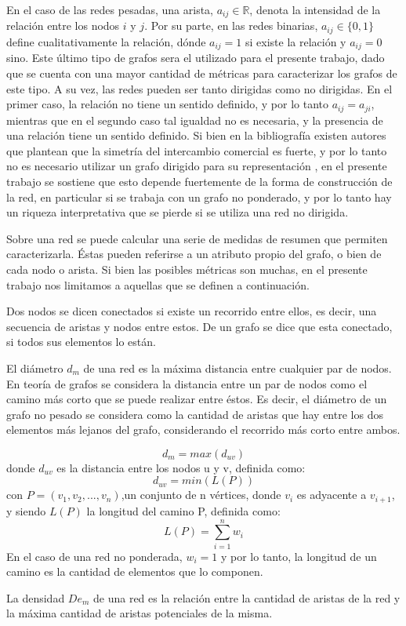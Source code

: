 \documentclass[a4paper]{article}
\begin{document}
En el caso de las redes pesadas, una arista, $a_{ij} \in \mathbb{R}$, denota la intensidad de la relación entre los nodos $i$ y $j$. Por su parte, en las redes binarias, $a_{ij} \in \{0,1\}$ define cualitativamente la relación, dónde $a_{ij} = 1$ si existe la relación y $a_{ij} = 0$ sino. Este último tipo de grafos sera el utilizado para el presente trabajo, dado que se cuenta con una mayor cantidad de métricas para caracterizar los grafos de este tipo.      
A su vez, las redes pueden ser tanto dirigidas como no dirigidas. En el primer caso, la relación no tiene un sentido definido, y por lo tanto $a_{ij} = a_{ji}$, mientras que en el segundo caso tal igualdad no es necesaria, y la presencia de una relación tiene un sentido definido. Si bien en la bibliografía existen autores que plantean que la simetría del intercambio comercial es fuerte, y por lo tanto no es necesario utilizar un grafo dirigido para su representación \cite{Fagiolo2007}, en el presente trabajo se sostiene que esto depende fuertemente de la forma de construcción de la red, en particular si se trabaja con un grafo no ponderado, y por lo tanto hay un riqueza interpretativa que se pierde si se utiliza una red no dirigida.       


Sobre una red se puede calcular una serie de medidas de resumen que permiten caracterizarla. Éstas pueden referirse a un atributo propio del grafo, o bien de cada nodo o arista. Si bien las posibles métricas son muchas, en el presente trabajo nos limitamos a aquellas que se definen a continuación. \par    
Dos nodos se dicen conectados si existe un recorrido entre ellos, es decir, una secuencia de aristas y nodos entre estos. De un grafo se dice que esta conectado, si todos sus elementos lo están. \par
El diámetro $d_m$ de una red es la máxima distancia entre cualquier par de nodos. En teoría de grafos se considera la distancia entre un par de nodos como el camino más corto que se puede realizar entre éstos. Es decir, el diámetro de un grafo no pesado se considera como la cantidad de aristas que hay entre los dos elementos más lejanos del grafo, considerando el recorrido más corto entre ambos. 

$$
d_m = max(d_{uv})
$$
donde $d_{uv}$ es la distancia entre los nodos u y v, definida como:
$$
d_{uv} = min(L(P))
$$
con $P = (v_1, v_2, ..., v_n)$,un conjunto de n vértices, donde $v_i$ es adyacente a $v_{i+1}$, y siendo $L(P)$ la longitud del camino P, definida como:
$$
L(P) = \sum_{i=1}^{n} w_i
$$
En el caso de una red no ponderada, $w_i = 1$ y por lo tanto, la longitud de un camino es la cantidad de elementos que lo componen. \par
La densidad $De_m$ de una red es la relación entre la cantidad de aristas de la red y la máxima cantidad de aristas potenciales de la misma. 
\end{document}
